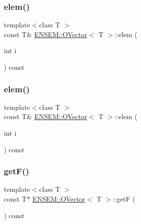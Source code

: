 \mbox{\label{classENSEM_1_1OVector_afddf0b325b50484d1c8f0ab8f0abd3c8}} 
\subsubsection{\texorpdfstring{elem()}{elem()}\hspace{0.1cm}{\footnotesize\ttfamily [3/4]}}
{\footnotesize\ttfamily template$<$class T $>$ \\
const T\& \mbox{\hyperlink{classENSEM_1_1OVector}{E\+N\+S\+E\+M\+::\+O\+Vector}}$<$ T $>$\+::elem (\begin{DoxyParamCaption}\item[{int}]{i }\end{DoxyParamCaption}) const\hspace{0.3cm}{\ttfamily [inline]}}

\mbox{\label{classENSEM_1_1OVector_afddf0b325b50484d1c8f0ab8f0abd3c8}} 
\subsubsection{\texorpdfstring{elem()}{elem()}\hspace{0.1cm}{\footnotesize\ttfamily [4/4]}}
{\footnotesize\ttfamily template$<$class T $>$ \\
const T\& \mbox{\hyperlink{classENSEM_1_1OVector}{E\+N\+S\+E\+M\+::\+O\+Vector}}$<$ T $>$\+::elem (\begin{DoxyParamCaption}\item[{int}]{i }\end{DoxyParamCaption}) const\hspace{0.3cm}{\ttfamily [inline]}}

\mbox{\label{classENSEM_1_1OVector_ab4767b83741c029b996a49662c021f88}} 
\subsubsection{\texorpdfstring{getF()}{getF()}\hspace{0.1cm}{\footnotesize\ttfamily [1/4]}}
{\footnotesize\ttfamily template$<$class T $>$ \\
const T$\ast$ \mbox{\hyperlink{classENSEM_1_1OVector}{E\+N\+S\+E\+M\+::\+O\+Vector}}$<$ T $>$\+::getF (\begin{DoxyParamCaption}{ }\end{DoxyParamCaption}) const\hspace{0.3cm}{\ttfamily [inline]}}



